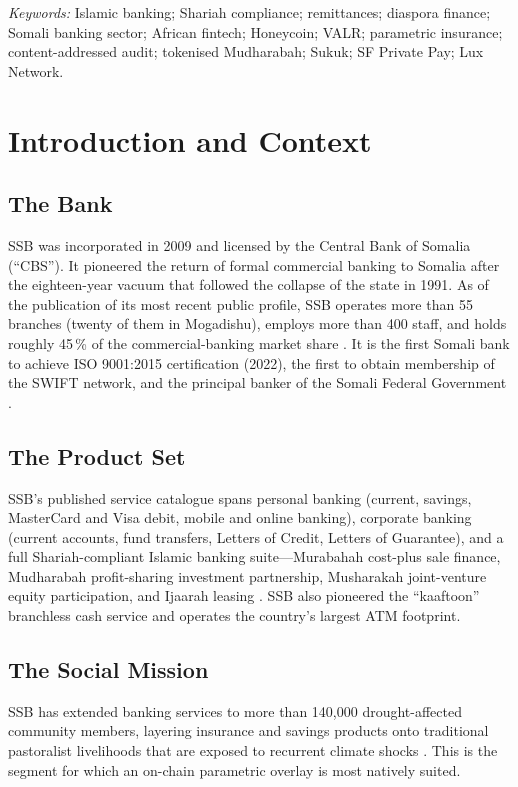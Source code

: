 \documentclass[11pt,letterpaper]{article}
\begin{document}
\vspace{0.6em}
\noindent\textit{Keywords:} Islamic banking; Shariah compliance;
remittances; diaspora finance; Somali banking sector; African
fintech; Honeycoin; VALR; parametric insurance; content-addressed
audit; tokenised Mudharabah; Sukuk; SF Private Pay; Lux Network.

\section{Introduction and Context}

\subsection{The Bank}
SSB was incorporated in 2009 and licensed by the Central Bank of
Somalia (``CBS''). It pioneered the return of formal commercial
banking to Somalia after the eighteen-year vacuum that followed the
collapse of the state in 1991. As of the publication of its most recent
public profile, SSB operates more than 55 branches (twenty of them in
Mogadishu), employs more than 400 staff, and holds roughly 45\,\% of
the commercial-banking market share
\cite{wikipedia_ssb,garowe_ssb}. It is the first Somali bank to achieve
ISO 9001:2015 certification (2022), the first to obtain membership of
the SWIFT network, and the principal banker of the Somali Federal
Government \cite{wikipedia_ssb,salaambank_history}.

\subsection{The Product Set}
SSB's published service catalogue spans personal banking (current,
savings, MasterCard and Visa debit, mobile and online banking),
corporate banking (current accounts, fund transfers, Letters of Credit,
Letters of Guarantee), and a full Shariah-compliant Islamic banking
suite---Murabahah cost-plus sale finance, Mudharabah profit-sharing
investment partnership, Musharakah joint-venture equity participation,
and Ijaarah leasing \cite{salaambank_about, salaambank_history}. SSB
also pioneered the ``kaaftoon'' branchless cash service and operates
the country's largest ATM footprint.

\subsection{The Social Mission}
SSB has extended banking services to more than 140{,}000
drought-affected community members, layering insurance and savings
products onto traditional pastoralist livelihoods that are exposed to
recurrent climate shocks \cite{garowe_ssb}. This is the segment for
which an on-chain parametric overlay is most natively suited.
\end{document}
